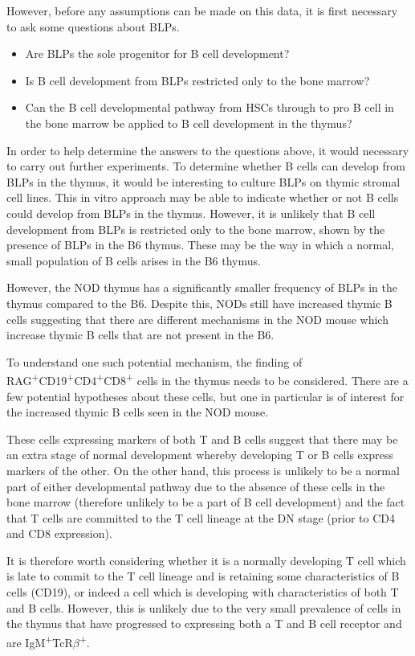 However, before any assumptions can be made on this data, it is first necessary to ask some questions about BLPs.
\begin{itemize}
\item Are BLPs the sole progenitor for B cell development?
\item Is B cell development from BLPs restricted only to the bone marrow?
\item Can the B cell developmental pathway from HSCs through to pro B cell in the bone marrow be applied to B cell development in the thymus?
\end{itemize}

In order to help determine the answers to the questions above, it would necessary to carry out further experiments.
To determine whether B cells can develop from BLPs in the thymus, it would be interesting to culture BLPs on thymic stromal cell lines.
This in vitro approach may be able to indicate whether or not B cells could develop from BLPs in the thymus.
However, it is unlikely that B cell development from BLPs is restricted only to the bone marrow, shown by the presence of BLPs in the B6 thymus.
These may be the way in which a normal, small population of B cells arises in the B6 thymus.

However, the NOD thymus has a significantly smaller frequency of BLPs in the thymus compared to the B6.
Despite this, NODs still have increased thymic B cells suggesting that there are different mechanisms in the NOD mouse which increase thymic B cells that are not present in the B6.

To understand one such potential mechanism, the finding of RAG\textsuperscript{+}CD19\textsuperscript{+}CD4\textsuperscript{+}CD8\textsuperscript{+} cells in the thymus needs to be considered.
There are a few potential hypotheses about these cells, but one in particular is of interest for the increased thymic B cells seen in the NOD mouse.

These cells expressing markers of both T and B cells suggest that there may be an extra stage of normal development whereby developing T or B cells express markers of the other.
On the other hand, this process is unlikely to be a normal part of either developmental pathway due to the absence of these cells in the bone marrow (therefore unlikely to be a part of B cell development) and the fact that T cells are committed to the T cell lineage at the DN stage (prior to CD4 and CD8 expression).

It is therefore worth considering whether it is a normally developing T cell which is late to commit to the T cell lineage and is retaining some characteristics of B cells (CD19), or indeed a cell which is developing with characteristics of both T and B cells.
However, this is unlikely due to the very small prevalence of cells in the thymus that have progressed to expressing both a T and B cell receptor and are IgM\textsuperscript{+}TcR$\beta$\textsuperscript{+}.

